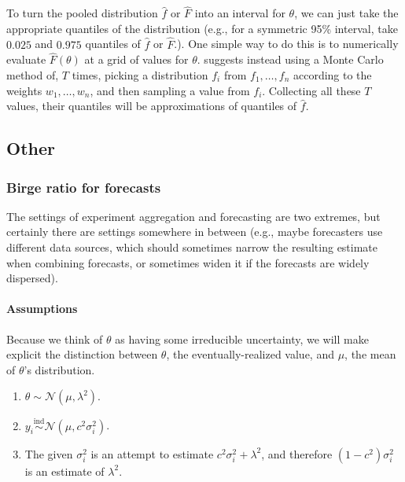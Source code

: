 \documentclass[12pt]{article}
\begin{document}
To turn the pooled distribution $\hat f$ or $\hat F$ into an interval for $\theta$, we can just take the appropriate quantiles of the distribution (e.g., for a symmetric 95\% interval, take $0.025$ and $0.975$ quantiles of $\hat f $ or $\hat F$.). One simple way to do this is to numerically evaluate $\hat F(\theta)$ at a grid of values for $\theta$. \cite{koepke2017consensus} suggests instead using a Monte Carlo method of, $T$ times, picking a distribution $f_i$ from $f_1,\ldots,f_n$ according to the weights $w_1,\ldots,w_n$, and then sampling a value from $f_i$. Collecting all these $T$ values, their quantiles will be approximations of quantiles of $\hat f$.

\subsection{Other}

\subsubsection{Birge ratio for forecasts}\label{birge-ratio-for-forecasts}

The settings of experiment aggregation and forecasting are two extremes, but certainly there are settings somewhere in between (e.g., maybe forecasters use different data sources, which should sometimes narrow the resulting estimate when combining forecasts, or sometimes widen it if the forecasts are widely dispersed).

\paragraph{Assumptions}\label{assumptions-6}

Because we think of $\theta$ as having some irreducible uncertainty, we will make explicit the distinction between $\theta$, the eventually-realized value, and $\mu$, the mean of $\theta$'s distribution.

\begin{enumerate}
\item
  $\theta\sim \mathcal{N}(\mu,\lambda^2)$.
\item
  $y_i\overset{\mathrm{ind}}{\sim}\mathcal{N}(\mu,c^2\sigma_i^2)$.
\item
  The given $\sigma_i^2$ is an attempt to estimate $c^2\sigma_i^2+\lambda^2$, and therefore $(1-c^2)\sigma_i^2$ is an estimate of $\lambda^2$.
\end{enumerate}
\end{document}
